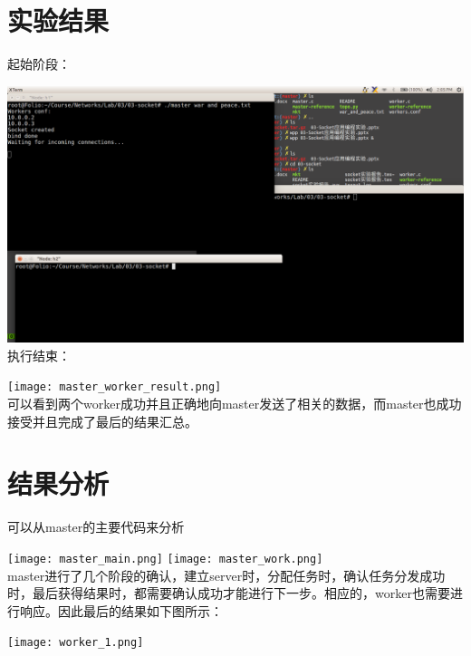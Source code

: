 \documentclass{ctexart}
\begin{document}
\section{实验结果}
\noindent 起始阶段：\par
\noindent\includegraphics[scale=0.25]{master_worker.png}\\
执行结束：\par
\noindent\texttt{[image: master\_worker\_result.png]}\\
\noindent 可以看到两个worker成功并且正确地向master发送了相关的数据，而master也成功接受并且完成了最后的结果汇总。
\section{结果分析}
\noindent 可以从master的主要代码来分析\par
\noindent\texttt{[image: master\_main.png]}
\texttt{[image: master\_work.png]}\\
\noindent master进行了几个阶段的确认，建立server时，分配任务时，确认任务分发成功时，最后获得结果时，都需要确认成功才能进行下一步。相应的，worker也需要进行响应。因此最后的结果如下图所示：\\\par
\noindent\texttt{[image: worker\_1.png]} 
\end{document}
